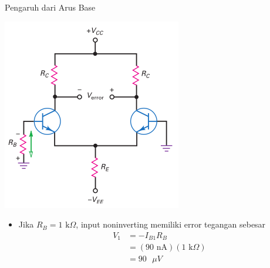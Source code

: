\documentclass[aspectratio=169]{beamer}
\begin{document}
\begin{frame}{Pengaruh dari Arus Base}
	\begin{multicols}{2}
		\begin{center}
			\includegraphics[height=0.7\textheight]{gambar/01.diff-amp/01.base_resistor_produces_unwanted_input_voltage}
		\end{center}
		\columnbreak
		\begin{itemize}
			\item Jika $ R_B = 1 \text{ k}\Omega $, input noninverting memiliki error tegangan sebesar
			\begin{align*}
				V_1 &= -I_{B1}R_B \\
				&= ( 90 \text{ nA} ) ( 1 \text{ k}\Omega ) \\
				&= 90 \text{ }\mu V
			\end{align*}
		\end{itemize}
	\end{multicols}
\end{frame}
\end{document}
